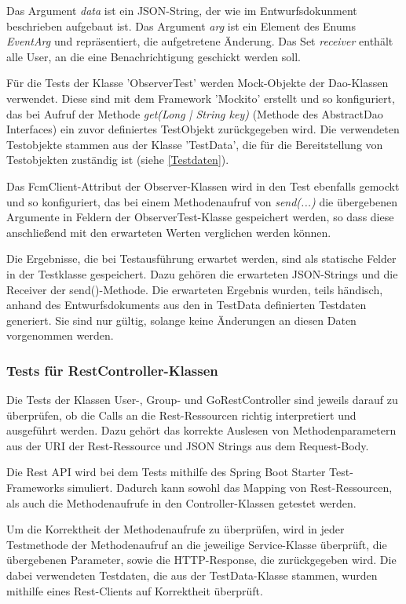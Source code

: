 \documentclass[11pt,a4paper]{scrartcl}
\begin{document}
Das Argument \textit{data} ist ein JSON-String, der wie im Entwurfsdokunment beschrieben aufgebaut ist. Das Argument \textit{arg} ist ein Element des Enums \textit{EventArg} und repräsentiert, die aufgetretene Änderung. Das Set \textit{receiver} enthält alle User, an die eine Benachrichtigung geschickt werden soll.

Für die Tests der Klasse 'ObserverTest' werden Mock-Objekte der Dao-Klassen verwendet. Diese sind mit dem Framework 'Mockito' erstellt und so konfiguriert, das bei Aufruf der Methode \textit{get({Long | String} key)} (Methode des AbstractDao Interfaces) ein zuvor definiertes TestObjekt zurückgegeben wird. Die verwendeten Testobjekte stammen aus der Klasse 'TestData', die für die Bereitstellung von Testobjekten zuständig ist (siehe \ref{Testdaten}).

Das FcmClient-Attribut der Observer-Klassen wird in den Test ebenfalls gemockt und so konfiguriert, das bei einem Methodenaufruf von \textit{send(...)} die übergebenen Argumente in Feldern der ObserverTest-Klasse gespeichert werden, so dass diese anschließend mit den erwarteten Werten verglichen werden können.

Die Ergebnisse, die bei Testausführung erwartet werden, sind als statische Felder in der Testklasse gespeichert. Dazu gehören die erwarteten JSON-Strings und die Receiver der send()-Methode.
Die erwarteten Ergebnis wurden, teils händisch, anhand des Entwurfsdokuments aus den in TestData definierten Testdaten generiert. Sie sind nur gültig, solange keine Änderungen an diesen Daten vorgenommen werden.

\subsubsection{Tests für RestController-Klassen}
Die Tests der Klassen User-, Group- und GoRestController sind jeweils darauf zu überprüfen, ob die Calls an die Rest-Ressourcen richtig interpretiert und ausgeführt werden. Dazu gehört das korrekte Auslesen von Methodenparametern aus der URI der Rest-Ressource und JSON Strings aus dem Request-Body.

Die Rest API wird bei dem Tests mithilfe des Spring Boot Starter Test-Frameworks simuliert. Dadurch kann sowohl das Mapping von Rest-Ressourcen, als auch die Methodenaufrufe in den Controller-Klassen getestet werden.

Um die Korrektheit der Methodenaufrufe zu überprüfen, wird in jeder Testmethode der Methodenaufruf an die jeweilige Service-Klasse überprüft, die übergebenen Parameter, sowie die HTTP-Response, die zurückgegeben wird. Die dabei verwendeten Testdaten, die aus der TestData-Klasse stammen, wurden mithilfe eines Rest-Clients auf Korrektheit überprüft.
\end{document}
